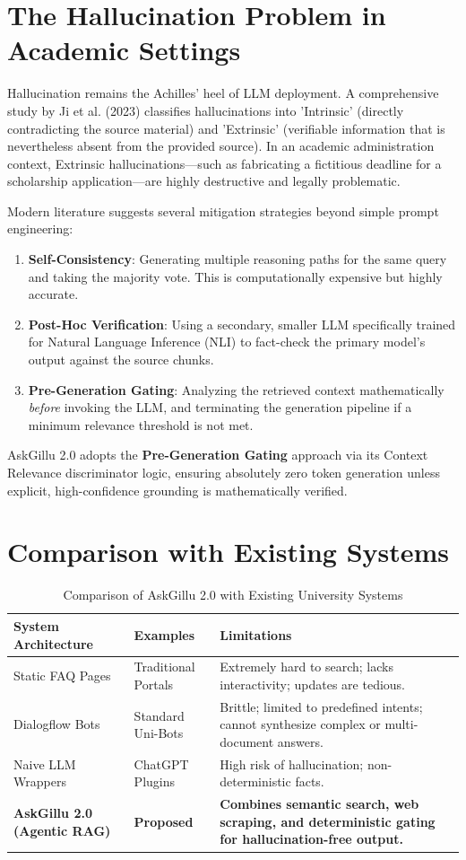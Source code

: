 \documentclass[12pt,a4paper]{report}
\begin{document}
\section{The Hallucination Problem in Academic Settings}
Hallucination remains the Achilles' heel of LLM deployment. A comprehensive study by Ji et al. (2023) classifies hallucinations into 'Intrinsic' (directly contradicting the source material) and 'Extrinsic' (verifiable information that is nevertheless absent from the provided source). In an academic administration context, Extrinsic hallucinations---such as fabricating a fictitious deadline for a scholarship application---are highly destructive and legally problematic.

Modern literature suggests several mitigation strategies beyond simple prompt engineering:
\begin{enumerate}
    \item \textbf{Self-Consistency}: Generating multiple reasoning paths for the same query and taking the majority vote. This is computationally expensive but highly accurate.
    \item \textbf{Post-Hoc Verification}: Using a secondary, smaller LLM specifically trained for Natural Language Inference (NLI) to fact-check the primary model's output against the source chunks.
    \item \textbf{Pre-Generation Gating}: Analyzing the retrieved context mathematically \textit{before} invoking the LLM, and terminating the generation pipeline if a minimum relevance threshold is not met.
\end{enumerate}
AskGillu 2.0 adopts the \textbf{Pre-Generation Gating} approach via its Context Relevance discriminator logic, ensuring absolutely zero token generation unless explicit, high-confidence grounding is mathematically verified.

\section{Comparison with Existing Systems}
\begin{table}[h]
\centering
\caption{Comparison of AskGillu 2.0 with Existing University Systems}
\label{tab:lit_comparison}
\begin{tabularx}{\textwidth}{|l|l|X|}
\hline
\textbf{System Architecture} & \textbf{Examples} & \textbf{Limitations} \\ \hline
Static FAQ Pages & Traditional Portals & Extremely hard to search; lacks interactivity; updates are tedious. \\ \hline
Dialogflow Bots & Standard Uni-Bots & Brittle; limited to predefined intents; cannot synthesize complex or multi-document answers. \\ \hline
Naive LLM Wrappers & ChatGPT Plugins & High risk of hallucination; non-deterministic facts. \\ \hline
\textbf{AskGillu 2.0 (Agentic RAG)} & \textbf{Proposed} & \textbf{Combines semantic search, web scraping, and deterministic gating for hallucination-free output.} \\ \hline
\end{tabularx}
\end{table}
\end{document}
